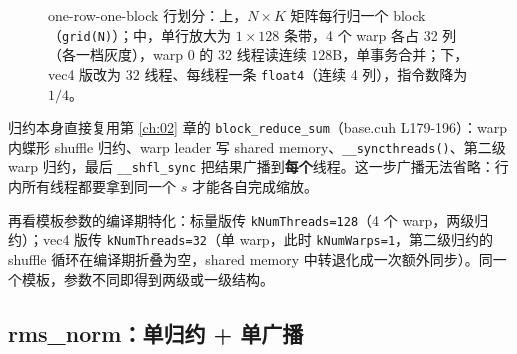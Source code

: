 \begin{figure}[H]
\caption{one-row-one-block 行划分：上，$N\times K$ 矩阵每行归一个 block（\texttt{grid(N)}）；中，单行放大为 $1\times128$ 条带，4 个 warp 各占 32 列（各一档灰度），warp 0 的 32 线程读连续 $128$B，单事务合并；下，vec4 版改为 $32$ 线程、每线程一条 \texttt{float4}（连续 4 列），指令数降为 $1/4$。}
\label{fig:6-3}
\end{figure}

归约本身直接复用第 \ref{ch:02} 章的 \texttt{block\_\allowbreak{}reduce\_\allowbreak{}sum}（base.cuh L179-196）：warp 内蝶形 shuffle 归约、warp leader 写 shared memory、\texttt{\_\allowbreak{}\_\allowbreak{}syncthreads\allowbreak{}()}、第二级 warp 归约，最后 \texttt{\_\_shfl\_sync} 把结果广播到\textbf{每个}线程。这一步广播无法省略：行内所有线程都要拿到同一个 $s$ 才能各自完成缩放。



再看模板参数的编译期特化：标量版传 \texttt{k\allowbreak{}Num\allowbreak{}Threads=\allowbreak{}128}（4 个 warp，两级归约）；vec4 版传 \texttt{k\allowbreak{}Num\allowbreak{}Threads=\allowbreak{}32}（单 warp，此时 \texttt{kNumWarps=1}，第二级归约的 shuffle 循环在编译期折叠为空，shared memory 中转退化成一次额外同步）。同一个模板，参数不同即得到两级或一级结构。

\subsection{rms\_norm：单归约 + 单广播}



